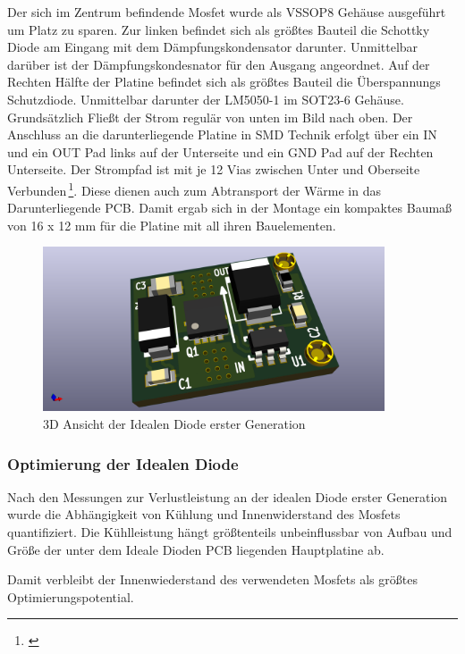 Der sich im Zentrum befindende Mosfet wurde als VSSOP8 Gehäuse ausgeführt um Platz zu sparen. Zur linken befindet sich als größtes Bauteil die Schottky Diode am Eingang mit dem Dämpfungskondensator darunter. Unmittelbar darüber ist der Dämpfungskondesnator für den Ausgang angeordnet. Auf der Rechten Hälfte der Platine befindet sich als größtes Bauteil die Überspannungs Schutzdiode. Unmittelbar darunter der LM5050-1 im SOT23-6 Gehäuse.
Grundsätzlich Fließt der Strom regulär von unten im Bild nach oben.
Der Anschluss an die darunterliegende Platine in SMD Technik erfolgt über ein IN und ein OUT Pad links auf der Unterseite und ein GND Pad auf der Rechten Unterseite.
Der Strompfad ist mit je 12 Vias zwischen Unter und Oberseite Verbunden\,\footnote{\cite[vgl.][Seite~24f.]{PCBStandard}}. Diese dienen auch zum Abtransport der Wärme in das Darunterliegende PCB.
Damit ergab sich in der Montage ein kompaktes Baumaß von 16 x 12 mm für die Platine mit all ihren Bauelementen.

\begin{figure}[H]
\centering
\includegraphics[width=0.9\textwidth]{bilder/Ideale_Diode/Ideale_Diode_Mini_rev01_ver00-3D.png} 
\caption{3D Ansicht der Idealen Diode erster Generation} 
\label{fig:3D Ansicht der Idealen Diode erster Generation}
\end{figure}

\subsubsection{Optimierung der Idealen Diode}

Nach den Messungen zur Verlustleistung an der idealen Diode erster Generation wurde die Abhängigkeit von Kühlung und Innenwiderstand des Mosfets quantifiziert. 
Die Kühlleistung hängt größtenteils unbeinflussbar \cite{IEEE_Thermal_conductivity} von Aufbau und Größe der unter dem Ideale Dioden PCB liegenden Hauptplatine ab.

Damit verbleibt der Innenwiederstand des verwendeten Mosfets als größtes Optimierungspotential.

